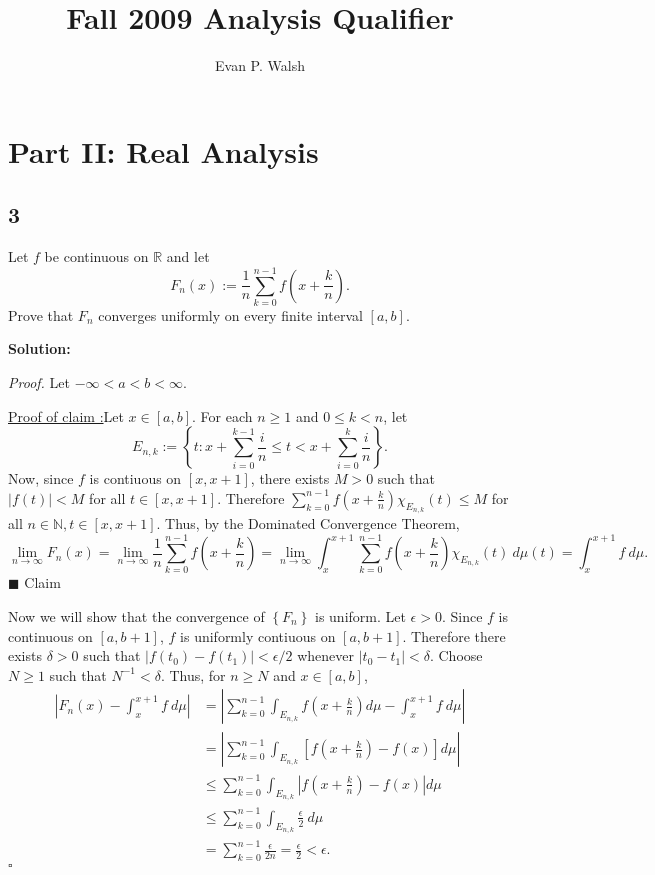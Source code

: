 \documentclass[12pt]{article}
\title{Fall 2009 Analysis Qualifier}
\author{Evan P. Walsh}
\newcounter{ProofCounter}
\newcounter{ClaimCounter}[ProofCounter]
\newenvironment{Proof}{\stepcounter{ProofCounter}\textit{Proof.}}{\hfill$\square$}
\newenvironment{claim}[1]{\vspace{3mm}\stepcounter{ClaimCounter}\par\noindent\underline{\bf Claim \theClaimCounter:}\space#1}{}
\newenvironment{claimproof}[1]{\par\noindent\underline{Proof of claim \theClaimCounter:}\space#1}{\hfill $\blacksquare$ Claim \theClaimCounter}
\begin{document}

\section*{Part II: Real Analysis}

\subsection*{3}
Let $f$ be continuous on $\mathbb{R}$ and let 
\[ F_{n}(x) := \frac{1}{n}\sum_{k=0}^{n-1}f\left( x + \frac{k}{n} \right). \]
Prove that $F_{n}$ converges uniformly on every finite interval $[a,b]$.

{\bf Solution:}

\begin{Proof}
Let $-\infty < a < b < \infty$.

\begin{claimproof}
Let $x \in [a,b]$. For each $n \geq 1$ and $0 \leq k < n$, let 
\[ E_{n,k} := \left\{ t : x + \sum_{i=0}^{k-1}\frac{i}{n} \leq t < x + \sum_{i=0}^{k}\frac{i}{n} \right\}. \]
Now, since $f$ is contiuous on $[x,x+1]$, there exists $M > 0$ such that $|f(t)| < M$ for all $t \in [x,x+1]$. Therefore $\sum_{k=0}^{n-1}f\left(
x + \frac{k}{n} \right)\chi_{E_{n,k}}(t) \leq M$ for all $n \in \mathbb{N}, t \in [x,x+1]$. Thus, by the Dominated Convergence Theorem,
\[ \lim_{n\rightarrow\infty}F_{n}(x) = \lim_{n\rightarrow\infty}\frac{1}{n}\sum_{k=0}^{n-1}f\left( x + \frac{k}{n} \right) = \lim_{n\rightarrow\infty}
\int_{x}^{x+1} \sum_{k=0}^{n-1}f\left( x + \frac{k}{n} \right)\chi_{E_{n,k}}(t)\ d\mu(t) = \int_{x}^{x+1}f\ d\mu. \]
\end{claimproof}

Now we will show that the convergence of $\left\{ F_{n} \right\}$ is uniform. Let $\epsilon > 0$. Since $f$ is continuous on $[a,b+1]$, $f$ is
uniformly contiuous on $[a,b+1]$. Therefore there exists $\delta > 0$ such that $|f(t_{0}) - f(t_{1})| < \epsilon/2$ whenever $|t_{0} - t_{1}| <
\delta$. Choose $N \geq 1$ such that $N^{-1} < \delta$. Thus, for $n \geq N$ and $x \in [a,b]$,
\begin{align*}
\left| F_{n}(x) - \int_{x}^{x+1}f\ d\mu \right| & = \left| \sum_{k=0}^{n-1} \int_{E_{n,k}}f\left( x + \frac{k}{n} \right)d\mu - \int_{x}^{x+1}f\
d\mu\right| \\
& = \left| \sum_{k=0}^{n-1}\int_{E_{n,k}}\left[f\left( x + \frac{k}{n} \right) - f(x)\right] d\mu \right| \\
& \leq \sum_{k=0}^{n-1}\int_{E_{n,k}}\left|f\left( x + \frac{k}{n} \right) - f(x)\right|d\mu \\
& \leq \sum_{k=0}^{n-1} \int_{E_{n,k}} \frac{\epsilon}{2}\ d\mu \\
& = \sum_{k=0}^{n-1}\frac{\epsilon}{2n} = \frac{\epsilon}{2} < \epsilon.
\end{align*}
\end{Proof}
\end{document}
